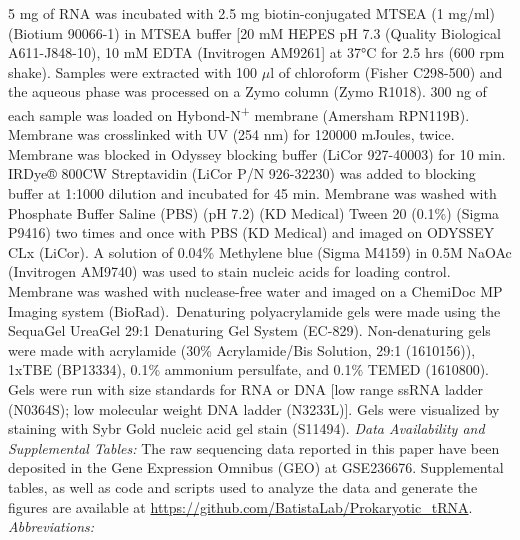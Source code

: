 \documentclass[times, twoside]{zHenriquesLab-StyleBioRxiv}
\begin{document}
5 mg of RNA was incubated with 2.5 mg biotin-conjugated MTSEA (1 mg/ml) (Biotium 90066-1) in MTSEA buffer [20 mM HEPES pH 7.3 (Quality Biological A611-J848-10), 10 mM EDTA (Invitrogen AM9261] at 37°C for 2.5 hrs (600 rpm shake). Samples were extracted with 100 \(\mu\)l of chloroform (Fisher C298-500) and the aqueous phase was processed on a Zymo column (Zymo R1018). 300 ng of each sample was loaded on Hybond-N\textsuperscript{+} membrane (Amersham RPN119B). Membrane was crosslinked with UV (254 nm) for 120000 mJoules, twice. Membrane was blocked in Odyssey blocking buffer (LiCor 927-40003) for 10 min. IRDye® 800CW Streptavidin (LiCor P/N 926-32230) was added to blocking buffer at 1:1000 dilution and incubated for 45 min. Membrane was washed with Phosphate Buffer Saline (PBS) (pH 7.2) (KD Medical) Tween 20 (0.1\%) (Sigma P9416) two times and once with PBS (KD Medical) and imaged on ODYSSEY CLx (LiCor). A solution of 0.04\% Methylene blue (Sigma M4159) in 0.5M NaOAc (Invitrogen AM9740) was used to stain nucleic acids for loading control. Membrane was washed with nuclease-free water and imaged on a ChemiDoc MP Imaging system (BioRad). Denaturing polyacrylamide gels were made using the SequaGel UreaGel 29:1 Denaturing Gel System (EC-829). Non-denaturing gels were made with acrylamide (30\% Acrylamide/Bis Solution, 29:1 (1610156)), 1xTBE (BP13334), 0.1\% ammonium persulfate, and 0.1\% TEMED (1610800). Gels were run with size standards for RNA or DNA [low range ssRNA ladder (N0364S); low molecular weight DNA ladder (N3233L)]. Gels were visualized by staining with Sybr Gold nucleic acid gel stain (S11494). 
\newline
\newline
\textit{Data Availability and Supplemental Tables:} \newline
The raw sequencing data reported in this paper have been deposited in the Gene Expression Omnibus (GEO) at GSE236676. Supplemental tables, as well as code and scripts used to analyze the data and generate the figures are available at \href{https://github.com/BatistaLab/Prokaryotic_tRNA}{https://github.com/BatistaLab/Prokaryotic\_tRNA}. 
\newline
\newline
\textit{Abbreviations:} \newline
\end{document}
